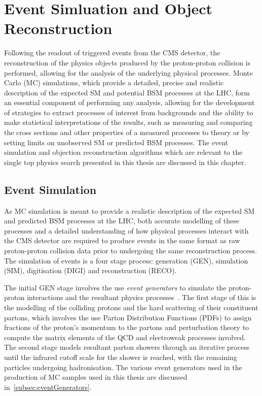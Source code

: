 \chapter{Event Simluation and Object Reconstruction}\label{chapter:data-mc}
Following the readout of triggered events from the CMS detector, the reconstruction of the physics objects produced by the proton-proton collision is performed, allowing for the analysis of the underlying physical processes.
Monte Carlo (MC) simulations, which provide a detailed, precise and realistic description of the expected SM and potential BSM processes at the LHC, form an essential component of performing any analysis, allowing for the development of strategies to extract processes of interest from backgrounds and the ability to make statistical interpretations of the results, such as measuring and comparing the cross sections and other properties of a measured processes to theory or by setting limits on unobserved SM or predicted BSM processes.
The event simulation and objection reconstruction algorithms which are relevant to the single top physics search presented in this thesis are discussed in this chapter.

\section{Event Simulation}\label{sec:sim}
As MC simulation is meant to provide a realistic description of the expected SM and predicted BSM processes at the LHC, 
both accurate modelling of these processes and a detailed understanding of how physical processes interact with the CMS detector are required to produce events in the same format as raw proton-proton collision data prior to undergoing the same reconstruction process.
The simulation of events is a four stage process: generation (GEN), simulation (SIM), digitisation (DIGI) and reconstruction (RECO).

The initial GEN stage involves the use \emph{event generators} to simulate the proton-proton interactions and the resultant physics processes~\cite{Buckley:2011ms,Hoche:2014rga}.
The first stage of this is the modelling of the colliding protons and the hard scattering of their constituent partons, which involves the use Parton Distribution Functions (PDFs) to assign fractions of the proton's momentum to the partons and perturbation theory to compute the matrix elements of the QCD and electroweak processes involved.
The second stage models resultant parton showers through an iterative process until the infrared cutoff scale for the shower is reached, with the remaining particles undergoing hadronisation.
The various event generators used in the production of MC samples used in this thesis are discussed in~\ref{subsec:eventGenerators}.

